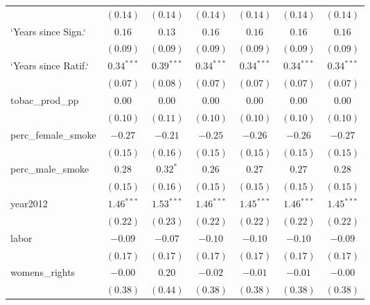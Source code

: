 \begin{table}[!h]
\begin{center}
\begin{tabular}{l c c c c c c }
                        & $(0.14)$     & $(0.14)$     & $(0.14)$     & $(0.14)$     & $(0.14)$     & $(0.14)$     \\
`Years since Sign.`     & $0.16$       & $0.13$       & $0.16$       & $0.16$       & $0.16$       & $0.16$       \\
                        & $(0.09)$     & $(0.09)$     & $(0.09)$     & $(0.09)$     & $(0.09)$     & $(0.09)$     \\
`Years since Ratif.`    & $0.34^{***}$ & $0.39^{***}$ & $0.34^{***}$ & $0.34^{***}$ & $0.34^{***}$ & $0.34^{***}$ \\
                        & $(0.07)$     & $(0.08)$     & $(0.07)$     & $(0.07)$     & $(0.07)$     & $(0.07)$     \\
tobac\_prod\_pp         & $0.00$       & $0.00$       & $0.00$       & $0.00$       & $0.00$       & $0.00$       \\
                        & $(0.10)$     & $(0.11)$     & $(0.10)$     & $(0.10)$     & $(0.10)$     & $(0.10)$     \\
perc\_female\_smoke     & $-0.27$      & $-0.21$      & $-0.25$      & $-0.26$      & $-0.26$      & $-0.27$      \\
                        & $(0.15)$     & $(0.16)$     & $(0.15)$     & $(0.15)$     & $(0.15)$     & $(0.15)$     \\
perc\_male\_smoke       & $0.28$       & $0.32^{*}$   & $0.26$       & $0.27$       & $0.27$       & $0.28$       \\
                        & $(0.15)$     & $(0.16)$     & $(0.15)$     & $(0.15)$     & $(0.15)$     & $(0.15)$     \\
year2012                & $1.46^{***}$ & $1.53^{***}$ & $1.46^{***}$ & $1.45^{***}$ & $1.46^{***}$ & $1.45^{***}$ \\
                        & $(0.22)$     & $(0.23)$     & $(0.22)$     & $(0.22)$     & $(0.22)$     & $(0.22)$     \\
labor                   & $-0.09$      & $-0.07$      & $-0.10$      & $-0.10$      & $-0.10$      & $-0.09$      \\
                        & $(0.17)$     & $(0.17)$     & $(0.17)$     & $(0.17)$     & $(0.17)$     & $(0.17)$     \\
womens\_rights          & $-0.00$      & $0.20$       & $-0.02$      & $-0.01$      & $-0.01$      & $-0.00$      \\
                        & $(0.38)$     & $(0.44)$     & $(0.38)$     & $(0.38)$     & $(0.38)$     & $(0.38)$     \\

\end{tabular}
\end{center}
\end{table}
